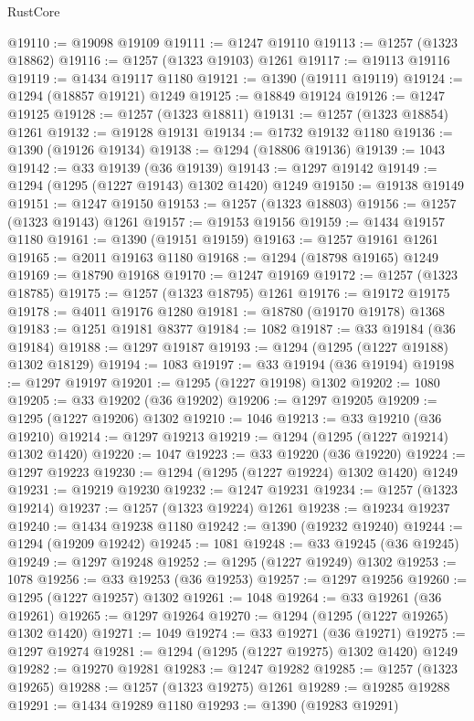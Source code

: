 \begin{lexlean}{RustCore}
\begin{coremodule}
@19110 := @19098 @19109
@19111 := @1247 @19110
@19113 := @1257 (@1323 @18862)
@19116 := @1257 (@1323 @19103) @1261
@19117 := @19113 @19116
@19119 := @1434 @19117 @1180
@19121 := @1390 (@19111 @19119)
@19124 := @1294 (@18857 @19121) @1249
@19125 := @18849 @19124
@19126 := @1247 @19125
@19128 := @1257 (@1323 @18811)
@19131 := @1257 (@1323 @18854) @1261
@19132 := @19128 @19131
@19134 := @1732 @19132 @1180
@19136 := @1390 (@19126 @19134)
@19138 := @1294 (@18806 @19136)
@19139 := 1043
@19142 := @33 @19139 (@36 @19139)
@19143 := @1297 @19142
@19149 := @1294 (@1295 (@1227 @19143) @1302 @1420) @1249
@19150 := @19138 @19149
@19151 := @1247 @19150
@19153 := @1257 (@1323 @18803)
@19156 := @1257 (@1323 @19143) @1261
@19157 := @19153 @19156
@19159 := @1434 @19157 @1180
@19161 := @1390 (@19151 @19159)
@19163 := @1257 @19161 @1261
@19165 := @2011 @19163 @1180
@19168 := @1294 (@18798 @19165) @1249
@19169 := @18790 @19168
@19170 := @1247 @19169
@19172 := @1257 (@1323 @18785)
@19175 := @1257 (@1323 @18795) @1261
@19176 := @19172 @19175
@19178 := @4011 @19176 @1280
@19181 := @18780 (@19170 @19178) @1368
@19183 := @1251 @19181 @8377
@19184 := 1082
@19187 := @33 @19184 (@36 @19184)
@19188 := @1297 @19187
@19193 := @1294 (@1295 (@1227 @19188) @1302 @18129)
@19194 := 1083
@19197 := @33 @19194 (@36 @19194)
@19198 := @1297 @19197
@19201 := @1295 (@1227 @19198) @1302
@19202 := 1080
@19205 := @33 @19202 (@36 @19202)
@19206 := @1297 @19205
@19209 := @1295 (@1227 @19206) @1302
@19210 := 1046
@19213 := @33 @19210 (@36 @19210)
@19214 := @1297 @19213
@19219 := @1294 (@1295 (@1227 @19214) @1302 @1420)
@19220 := 1047
@19223 := @33 @19220 (@36 @19220)
@19224 := @1297 @19223
@19230 := @1294 (@1295 (@1227 @19224) @1302 @1420) @1249
@19231 := @19219 @19230
@19232 := @1247 @19231
@19234 := @1257 (@1323 @19214)
@19237 := @1257 (@1323 @19224) @1261
@19238 := @19234 @19237
@19240 := @1434 @19238 @1180
@19242 := @1390 (@19232 @19240)
@19244 := @1294 (@19209 @19242)
@19245 := 1081
@19248 := @33 @19245 (@36 @19245)
@19249 := @1297 @19248
@19252 := @1295 (@1227 @19249) @1302
@19253 := 1078
@19256 := @33 @19253 (@36 @19253)
@19257 := @1297 @19256
@19260 := @1295 (@1227 @19257) @1302
@19261 := 1048
@19264 := @33 @19261 (@36 @19261)
@19265 := @1297 @19264
@19270 := @1294 (@1295 (@1227 @19265) @1302 @1420)
@19271 := 1049
@19274 := @33 @19271 (@36 @19271)
@19275 := @1297 @19274
@19281 := @1294 (@1295 (@1227 @19275) @1302 @1420) @1249
@19282 := @19270 @19281
@19283 := @1247 @19282
@19285 := @1257 (@1323 @19265)
@19288 := @1257 (@1323 @19275) @1261
@19289 := @19285 @19288
@19291 := @1434 @19289 @1180
@19293 := @1390 (@19283 @19291)

\end{coremodule}
\end{lexlean}
